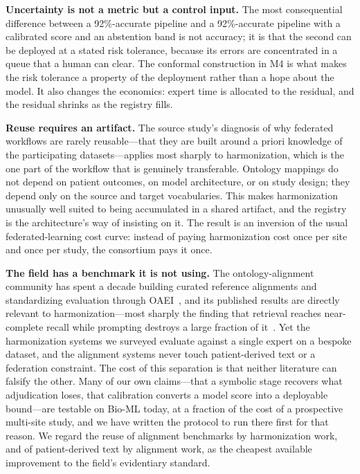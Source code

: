 \documentclass[conference]{IEEEtran}
\begin{document}
\textbf{Uncertainty is not a metric but a control input.} The most consequential difference between a 92\%-accurate pipeline and a 92\%-accurate pipeline with a calibrated score and an abstention band is not accuracy; it is that the second can be deployed at a stated risk tolerance, because its errors are concentrated in a queue that a human can clear. The conformal construction in M4 is what makes the risk tolerance a property of the deployment rather than a hope about the model. It also changes the economics: expert time is allocated to the residual, and the residual shrinks as the registry fills.

\textbf{Reuse requires an artifact.} The source study's diagnosis of why federated workflows are rarely reusable---that they are built around a priori knowledge of the participating datasets---applies most sharply to harmonization, which is the one part of the workflow that is genuinely transferable. Ontology mappings do not depend on patient outcomes, on model architecture, or on study design; they depend only on the source and target vocabularies. This makes harmonization unusually well suited to being accumulated in a shared artifact, and the registry is the architecture's way of insisting on it. The result is an inversion of the usual federated-learning cost curve: instead of paying harmonization cost once per site and once per study, the consortium pays it once.

\textbf{The field has a benchmark it is not using.} The ontology-alignment community has spent a decade building curated reference alignments and standardizing evaluation through OAEI~\cite{b55}, and its published results are directly relevant to harmonization---most sharply the finding that retrieval reaches near-complete recall while prompting destroys a large fraction of it~\cite{b54}. Yet the harmonization systems we surveyed evaluate against a single expert on a bespoke dataset, and the alignment systems never touch patient-derived text or a federation constraint. The cost of this separation is that neither literature can falsify the other. Many of our own claims---that a symbolic stage recovers what adjudication loses, that calibration converts a model score into a deployable bound---are testable on Bio-ML today, at a fraction of the cost of a prospective multi-site study, and we have written the protocol to run there first for that reason. We regard the reuse of alignment benchmarks by harmonization work, and of patient-derived text by alignment work, as the cheapest available improvement to the field's evidentiary standard.
\end{document}
